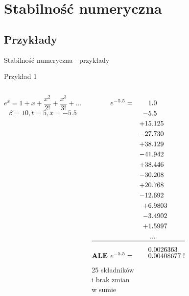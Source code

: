 \section{Stabilność numeryczna}
\subsection{Przykłady}
\begin{frame}{Stabilność numeryczna - przykłady}
	\begin{exampleblock}{Przykład 1}
    \fontsize{9}{9}
      \begin{columns}[T]
        \vspace{.5cm}
            \[
                e^x = 1 + x + \frac{x^2}{2!} + \frac{x^3}{3!} + ...
            \]\[
                \beta = 10, t = 5, x = -5.5
            \]
          \begin{columns}
                  \begin{align*}
                      e^{-5.5}  	=& &   1&.0 \\
                                   & &  -5&.5 \\
                                   & & +15&.125 \\
                                   & & -27&.730 \\
                                   & & +38&.129 \\
                                   & & -41&.942 \\
                                   & & +38&.446 \\
                                   & & -30&.208 \\
                                   & & +20&.768 \\
                                   & & -12&.692 \\
                                   & &  +6&.9803 \\
                                   & &  -3&.4902 \\
                                   & &  +1&.5997 \\
                                   & & .&..\\
                                   \hline \\[-8pt]
                                   & &   0&.0026363
                  \\[-7pt]
                  \text{\bf ALE  } e^{-5.5} =& & 0&.00408677 \hspace{3pt} !
                  \end{align*}
                  25 składników \\i brak zmian \\w sumie
          \end{columns}
      \end{columns}
	\end{exampleblock}
\end{frame}

